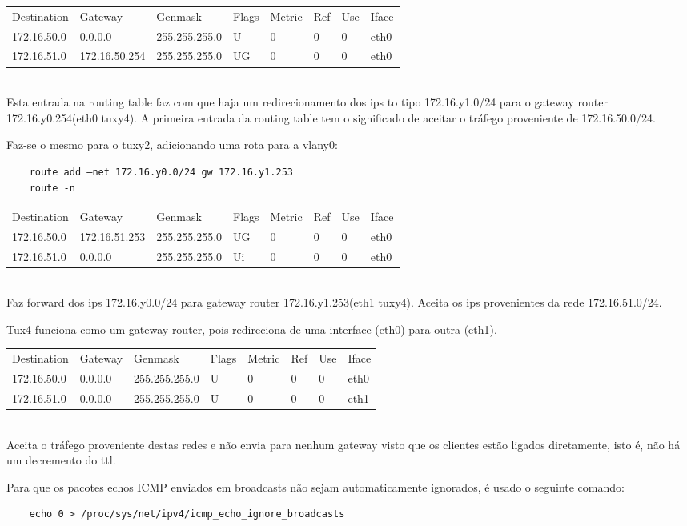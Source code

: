 \documentclass[a4paper]{article}
\begin{document}
\begin{tabular}{l l l l l l l l}
Destination & Gateway & Genmask & Flags & Metric & Ref & Use & Iface \\
172.16.50.0 & 0.0.0.0 & 255.255.255.0 & U & 0 & 0 & 0 & eth0 \\
172.16.51.0 & 172.16.50.254 & 255.255.255.0 & UG & 0 & 0 & 0 & eth0
\end{tabular} \\

Esta entrada na routing table faz com que haja um redirecionamento dos ips to tipo 172.16.y1.0/24 para o gateway router
172.16.y0.254(eth0 tuxy4). A primeira entrada da routing table tem o significado de aceitar o tráfego proveniente de 172.16.50.0/24.

Faz-se o mesmo para o tuxy2, adicionando uma rota para a vlany0:
\begin{verbatim}
	route add –net 172.16.y0.0/24 gw 172.16.y1.253
	route -n
\end{verbatim}

\begin{tabular}{l l l l l l l l}
Destination & Gateway & Genmask & Flags & Metric & Ref & Use & Iface \\
172.16.50.0 & 172.16.51.253 & 255.255.255.0 & UG & 0 & 0 & 0 & eth0 \\
172.16.51.0 & 0.0.0.0 & 255.255.255.0 & Ui & 0 & 0 & 0 & eth0
\end{tabular} \\

Faz forward dos ips 172.16.y0.0/24 para gateway router 172.16.y1.253(eth1 tuxy4). Aceita os ips provenientes da rede 172.16.51.0/24.

Tux4 funciona como um gateway router, pois redireciona de uma interface (eth0) para outra (eth1).

\begin{tabular}{l l l l l l l l}
Destination & Gateway & Genmask & Flags & Metric & Ref & Use & Iface \\
172.16.50.0 & 0.0.0.0 & 255.255.255.0 & U & 0 & 0 & 0 & eth0 \\
172.16.51.0 & 0.0.0.0 & 255.255.255.0 & U & 0 & 0 & 0 & eth1
\end{tabular} \\

Aceita o tráfego proveniente destas redes e não envia para nenhum gateway visto que os clientes
estão ligados diretamente, isto é, não há um decremento do ttl.

Para que os pacotes echos ICMP enviados em broadcasts não sejam automaticamente ignorados, é usado o seguinte comando:
\begin{verbatim}
	echo 0 > /proc/sys/net/ipv4/icmp_echo_ignore_broadcasts
\end{verbatim}
\end{document}
